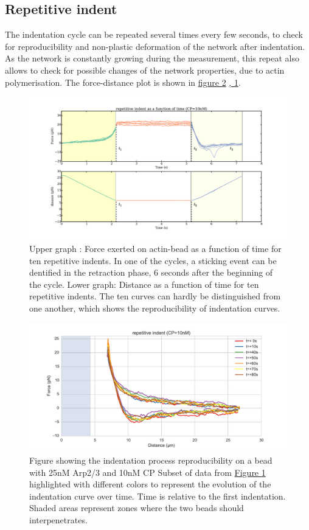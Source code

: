 \documentclass[A4paperpaper,11pt,english]{sphinxmanual}
\begin{document}
\subsection{Repetitive indent}
\label{parts/part3:repetitive-indent}
The indentation cycle can be repeated several times every few seconds, to check for reproducibility and non-plastic deformation of the network after
indentation. As the network is constantly growing during the measurement, this
repeat also allows to check for possible changes of the network properties, due to actin
polymerisation. The force-distance plot is shown in \hyperref[parts/part3:reproc]{figure  \ref*{parts/part3:reproc}} \hyperref[parts/part3:reproc-time]{,  \ref*{parts/part3:reproc-time}}.
\begin{figure}[htbp]
\centering
\capstart

\includegraphics[width=1.000\linewidth]{reproc-time.pdf}
\caption{Upper graph : Force exerted on actin-bead as a function of time for ten
repetitive indents. In one of the cycles, a sticking event can be dentified in the
retraction phase, 6 seconds after the beginning of the cycle. Lower graph:
Distance as a function of time for  ten repetitive indents. The ten curves
can hardly be distinguished from one another, which shows the
reproducibility of indentation curves.}\label{parts/part3:reproc-time}\end{figure}
\begin{figure}[htbp]
\centering
\capstart

\includegraphics[width=0.800\linewidth]{reproc.pdf}
\caption{Figure showing the indentation process reproducibility on a bead with
25nM Arp2/3 and 10nM CP Subset of data from \hyperref[parts/part3:reproc-time]{Figure  \ref*{parts/part3:reproc-time}} highlighted
with different colors to represent the evolution of the indentation curve
over time.  Time is relative to the first indentation. Shaded areas represent
zones where the two beads should  interpenetrates.}\label{parts/part3:reproc}\end{figure}
\end{document}
